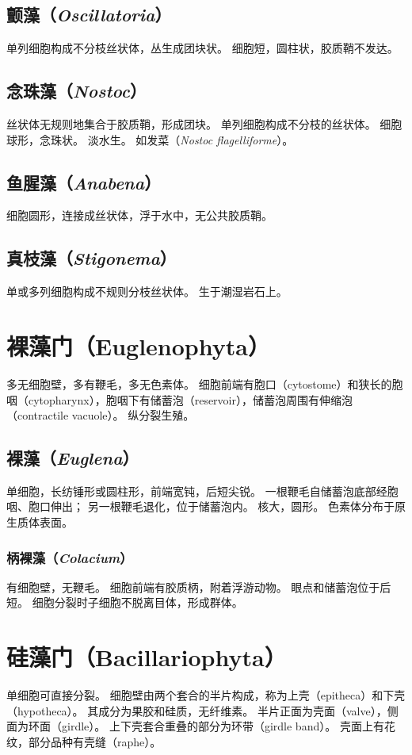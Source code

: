 \documentclass[11pt]{article}
\begin{document}
\subsection{颤藻（\textit{Oscillatoria}）}
单列细胞构成不分枝丝状体，丛生成团块状。
细胞短，圆柱状，胶质鞘不发达。

\subsection{念珠藻（\textit{Nostoc}）}
丝状体无规则地集合于胶质鞘，形成团块。
单列细胞构成不分枝的丝状体。
细胞球形，念珠状。
淡水生。
如发菜（\textit{Nostoc flagelliforme}）。

\subsection{鱼腥藻（\textit{Anabena}）}
细胞圆形，连接成丝状体，浮于水中，无公共胶质鞘。

\subsection{真枝藻（\textit{Stigonema}）}
单或多列细胞构成不规则分枝丝状体。
生于潮湿岩石上。

\section{裸藻门（Euglenophyta）}
多无细胞壁，多有鞭毛，多无色素体。
细胞前端有胞口（cytostome）和狭长的胞咽（cytopharynx），胞咽下有储蓄泡（reservoir），储蓄泡周围有伸缩泡（contractile vacuole）。
纵分裂生殖。

\subsection{裸藻（\textit{Euglena}）}
单细胞，长纺锤形或圆柱形，前端宽钝，后短尖锐。
一根鞭毛自储蓄泡底部经胞咽、胞口伸出；
另一根鞭毛退化，位于储蓄泡内。
核大，圆形。
色素体分布于原生质体表面。

\subsubsection{柄裸藻（\textit{Colacium}）}
有细胞壁，无鞭毛。
细胞前端有胶质柄，附着浮游动物。
眼点和储蓄泡位于后短。
细胞分裂时子细胞不脱离目体，形成群体。

\section{硅藻门（Bacillariophyta）}
单细胞可直接分裂。
细胞壁由两个套合的半片构成，称为上壳（epitheca）和下壳（hypotheca）。
其成分为果胶和硅质，无纤维素。
半片正面为壳面（valve），侧面为环面（girdle）。
上下壳套合重叠的部分为环带（girdle band）。
壳面上有花纹，部分品种有壳缝（raphe）。
\end{document}
